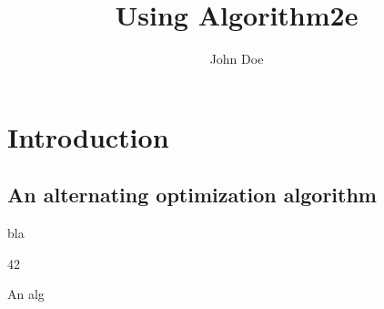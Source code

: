 \documentclass{article}
\begin{document}
\title{Using Algorithm2e}
\author{John Doe}
\maketitle

\section{Introduction}


\subsection{An alternating optimization algorithm}
bla 

\begin{algorithm}[h]
 \SetAlgoLined
 42\;
 \caption{An alg \label{alg:altOptRW}}
\end{algorithm}
\end{document}
